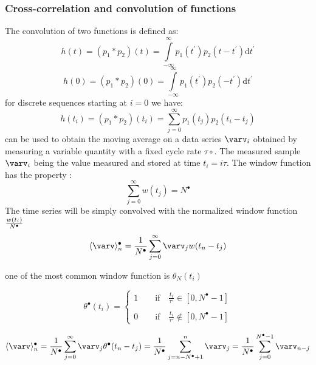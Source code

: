 \subsubsection{Cross-correlation and convolution of functions}

The convolution of two functions is defined as:
\begin{equation}
h(t)=(p_1\ast p_2)(t)=\int\limits_{-\infty}^{\infty} p_1(t^\prime)p_2(t-t^\prime) \mathrm{d}t^\prime
\end{equation}
\begin{equation}
h(0)=(p_1\ast p_2)(0)=\int\limits_{-\infty}^{\infty} p_1(t^\prime)p_2(-t^\prime) \mathrm{d}t^\prime
\end{equation}
for discrete sequences starting at $i=0$ we have:
\begin{equation}
\boxed{
h(t_i)=(p_1\ast p_2)(t_i)=\sum\limits_{j=0}^{\infty} p_1(t_j)p_2(t_i-t_j)
}
\end{equation}
can be used to obtain the moving average on a data series $\varv_i$  obtained by measuring a variable quantity with a fixed cycle rate $\tau\circ$. The measured sample $\varv_i$ being the value measured and stored at time $t_i=i\tau $.
The window function has the property :
\begin{equation}
\sum\limits_{j=0}^{\infty} w(t_j) = N^\bullet
\end{equation}
The time series will be simply convolved with the normalized window function $w(t_i)\over N^\bullet$
\begin{equation}
\langle \varv \rangle^\bullet_n = \frac{1}{N^\bullet}\sum\limits_{j=0}^{\infty} \varv_{j} w(t_n-t_j)
\end{equation}

one of the most common window function is $\theta_N(t_i)$

\begin{equation}
\theta^\bullet(t_i) = \left\{
\begin{array}{l}
{\displaystyle 1 \qquad \mathrm{ if } \quad \frac{t_i}{\tau^\circ} \in [0,N^\bullet-1]  }\\ \\
{\displaystyle 0 \qquad \mathrm{ if } \quad \frac{t_i}{\tau^\circ} \notin [0,N^\bullet-1]  }
\end{array}
\right.
\end{equation}

\begin{equation}
\langle \varv \rangle^\bullet_n = \frac{1}{N^\bullet}\sum\limits_{j=0}^{\infty} \varv_{j} \theta^\bullet(t_n-t_j)=\frac{1}{N^\bullet}\sum\limits_{j=n-N^\bullet+1}^{n} \varv_{j}=\frac{1}{N^\bullet}\sum\limits_{j=0}^{N^\bullet-1} \varv_{n-j}
\end{equation}



